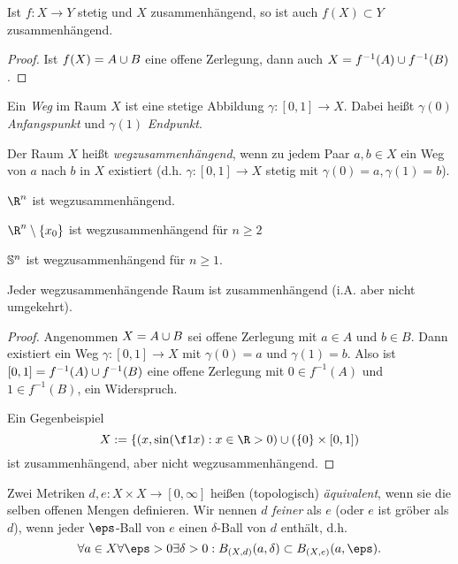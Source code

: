 \begin{st}
	Ist $f: X \to Y$ stetig und $X$ zusammenhängend, so ist auch $f(X) \subset Y$ zusammenhängend.
	\begin{proof}
		Ist $f(X) = A \dunion B$ eine offene Zerlegung, dann auch $X = f^{-1}(A) \dunion f^{-1}(B)$.
	\end{proof}
\end{st}

\begin{df}
	Ein \emph{Weg} im Raum $X$ ist eine stetige Abbildung $\gamma: [0,1] \to X$.
	Dabei heißt $\gamma(0)$ \emph{Anfangspunkt} und $\gamma(1)$ \emph{Endpunkt}.

	Der Raum $X$ heißt \emph{wegzusammenhängend}, wenn zu jedem Paar $a,b \in X$ ein Weg von $a$ nach $b$ in $X$ existiert (d.h. $\gamma:[0,1] \to X$ stetig mit $\gamma(0) = a, \gamma(1) = b$).
\end{df}

\begin{ex}
	$\R^n$ ist wegzusammenhängend.

	$\R^n \setminus \{x_0\}$ ist wegzusammenhängend für $n \ge 2$

	$\S^n$ ist wegzusammenhängend für $n \ge 1$.
\end{ex}

\begin{st}
	Jeder wegzusammenhängende Raum ist zusammenhängend (i.A. aber nicht umgekehrt).
	\begin{proof}
		Angenommen $X = A \dunion B$ sei offene Zerlegung mit $a \in A$ und $b \in B$.
		Dann existiert ein Weg $\gamma: [0,1] \to X$ mit $\gamma(0) = a$ und $\gamma(1) = b$.
		Also ist $[0,1] = f^{-1}(A) \dunion f^{-1}(B)$ eine offene Zerlegung mit $0 \in f^{-1}(A)$ und $1 \in f^{-1}(B)$, ein Widerspruch.

		Ein Gegenbeispiel
		\[
			X := \{ (x,\sin(\f 1x) : x \in \R>0) \cup ( \{0\} \times [0,1] )
		\]
		ist zusammenhängend, aber nicht wegzusammenhängend.
	\end{proof}
\end{st}

\begin{df}
	Zwei Metriken $d,e : X \times X \to [0, \infty]$ heißen (topologisch) \emph{äquivalent}, wenn sie die selben offenen Mengen definieren.
	Wir nennen $d$ \emph{feiner} als $e$ (oder $e$ ist gröber als $d$), wenn jeder $\eps$-Ball von $e$ einen $\delta$-Ball von $d$ enthält, d.h.
	\[
		\forall a \in X \forall \eps > 0 \exists \delta > 0 : B_{(X,d)}(a, \delta) \subset B_{(X,e)}(a, \eps).
	\]
\end{df}

